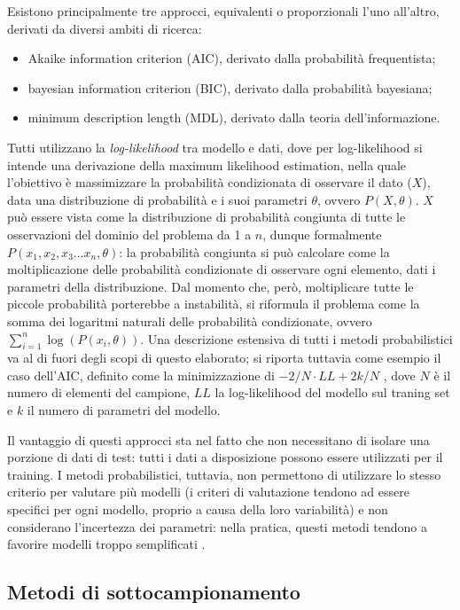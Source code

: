 \documentclass[12pt,a4paper]{report}
\begin{document}
Esistono principalmente tre approcci, equivalenti o proporzionali l'uno all'altro, derivati da diversi ambiti di ricerca:
\begin{itemize}
	\item{Akaike information criterion (AIC), derivato dalla probabilità frequentista;}
	\item{bayesian information criterion (BIC), derivato dalla probabilità bayesiana;}
	\item{minimum description length (MDL), derivato dalla teoria dell'informazione.}
\end{itemize}

Tutti utilizzano la \emph{log-likelihood} tra modello e dati, dove per log-likelihood si intende una derivazione della maximum likelihood estimation, nella quale l'obiettivo è massimizzare la probabilità condizionata di osservare il dato ($X$), data una distribuzione di probabilità e i suoi parametri $\theta$, ovvero $P(X, \theta)$. $X$ può essere vista come la distribuzione di probabilità congiunta di tutte le osservazioni del dominio del problema da 1 a $n$, dunque formalmente $P(x_1, x_2, x_3 \dots x_n, \theta)$: la probabilità congiunta si può calcolare come la moltiplicazione delle probabilità condizionate di osservare ogni elemento, dati i parametri della distribuzione. Dal momento che, però, moltiplicare tutte le piccole probabilità porterebbe a instabilità, si riformula il problema come la somma dei logaritmi naturali delle probabilità condizionate, ovvero $\sum_{i=1}^n\log(P(x_i,\theta))$.
Una descrizione estensiva di tutti i metodi probabilistici va al di fuori degli scopi di questo elaborato; si riporta tuttavia come esempio il caso dell'AIC, definito come la minimizzazione di $-2/N \cdot LL + 2k/N$ \cite{probabilisticMethod}, dove $N$ è il numero di elementi del campione, $LL$ la log-likelihood del modello sul traning set e $k$ il numero di parametri del modello.

Il vantaggio di questi approcci sta nel fatto che non necessitano di isolare una porzione di dati di test: tutti i dati a disposizione possono essere utilizzati per il training. I metodi probabilistici, tuttavia, non permettono di utilizzare lo stesso criterio per valutare più modelli (i criteri di valutazione tendono ad essere specifici per ogni modello, proprio a causa della loro variabilità) e non considerano l'incertezza dei parametri: nella pratica, questi metodi tendono a favorire modelli troppo semplificati \cite{APM}.
\subsection{Metodi di sottocampionamento}
\end{document}
